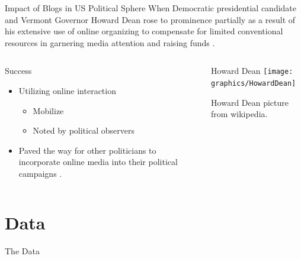 \documentclass{beamer}
\begin{document}
\begin{frame}

\begin{block}{Impact of Blogs in US Political Sphere}
 When Democratic presidential candidate and Vermont Governor Howard Dean rose to prominence partially as a result of his extensive use of online organizing to compensate for limited conventional resources in garnering media attention and raising funds \citep{ammori05,kerbel05}.  
\end{block}

\begin{columns}


\begin{block}{Success}
\begin{itemize}
\item Utilizing online interaction 
\begin{itemize}
\item Mobilize
\item Noted by political observers
\end{itemize}
\item Paved the way for other politicians to incorporate online media into their political campaigns \citep{cone03}.  
\end{itemize}
\end{block}



\begin{block}{Howard Dean}
\center
\texttt{[image: graphics/HowardDean]}

{\tiny Howard Dean picture from wikipedia.}
\end{block}

\end{columns}
\end{frame}


\section{Data}


\begin{frame}

\begin{block}{

\center

The Data\\

 \
}
\end{block}


\end{frame}
\end{document}
